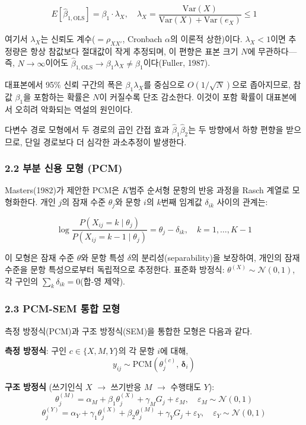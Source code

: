 \documentclass[a4paper,10pt]{oblivoir}
\begin{document}
\[E[\hat{\beta}_{1,\text{OLS}}] = \beta_1 \cdot \lambda_X, \quad \lambda_X = \frac{\text{Var}(X)}{\text{Var}(X) + \text{Var}(e_X)} \leq 1\]

여기서 $\lambda_X$는 신뢰도 계수($= \rho_{XX'}$, Cronbach $\alpha$의 이론적 상한)이다. $\lambda_X < 1$이면 추정량은 항상 참값보다 절대값이 작게 추정되며, 이 편향은 표본 크기 $N$에 무관하다—즉, $N \to \infty$이어도 $\hat{\beta}_{1,\text{OLS}} \to \beta_1 \lambda_X \neq \beta_1$이다(Fuller, 1987).

대표본에서 95\% 신뢰 구간의 폭은 $\beta_1 \lambda_X$를 중심으로 $O(1/\sqrt{N})$으로 좁아지므로, 참값 $\beta_1$을 포함하는 확률은 $N$이 커질수록 단조 감소한다. 이것이 포함 확률이 대표본에서 오히려 악화되는 역설의 원인이다.

다변수 경로 모형에서 두 경로의 곱인 간접 효과 $\hat{\beta}_1 \hat{\beta}_2$는 두 방향에서 하향 편향을 받으므로, 단일 경로보다 더 심각한 과소추정이 발생한다.

\subsubsection{2.2 부분 신용 모형 (PCM)}

Masters(1982)가 제안한 PCM은 $K$범주 순서형 문항의 반응 과정을 Rasch 계열로 모형화한다. 개인 $j$의 잠재 수준 $\theta_j$와 문항 $i$의 $k$번째 임계값 $\delta_{ik}$ 사이의 관계는:

\[\log \frac{P(X_{ij}=k \mid \theta_j)}{P(X_{ij}=k-1 \mid \theta_j)} = \theta_j - \delta_{ik}, \quad k = 1, \ldots, K-1\]

이 모형은 잠재 수준 $\theta$와 문항 특성 $\delta$의 분리성(separability)을 보장하여, 개인의 잠재 수준을 문항 특성으로부터 독립적으로 추정한다. 표준화 방정식: $\theta^{(X)} \sim \mathcal{N}(0,1)$, 각 구인의 $\sum_k \delta_{ik} = 0$(합-영 제약).

\subsubsection{2.3 PCM-SEM 통합 모형}

측정 방정식(PCM)과 구조 방정식(SEM)을 통합한 모형은 다음과 같다.

\textbf{측정 방정식}: 구인 $c \in \{X, M, Y\}$의 각 문항 $i$에 대해,
\[y_{ij} \sim \text{PCM}(\theta_j^{(c)},\, \boldsymbol{\delta}_i)\]

\textbf{구조 방정식} (쓰기인식 $X$ \ensuremath{\rightarrow} 쓰기반응 $M$ \ensuremath{\rightarrow} 수행태도 $Y$):
\[\theta_j^{(M)} = \alpha_M + \beta_1 \theta_j^{(X)} + \gamma_M G_j + \varepsilon_M, \quad \varepsilon_M \sim \mathcal{N}(0,1)\]
\[\theta_j^{(Y)} = \alpha_Y + \gamma_1 \theta_j^{(X)} + \beta_2 \theta_j^{(M)} + \gamma_Y G_j + \varepsilon_Y, \quad \varepsilon_Y \sim \mathcal{N}(0,1)\]
\end{document}
